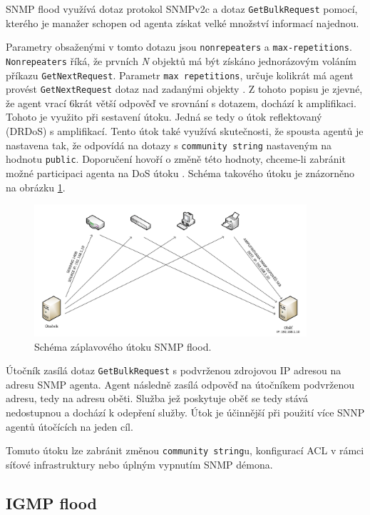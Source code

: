 SNMP flood využívá dotaz protokol SNMPv2c a dotaz \texttt{GetBulkRequest} pomocí, kterého je manažer schopen od agenta získat velké množství informací najednou.

Parametry obsaženými v tomto dotazu jsou \texttt{nonrepeaters} a \texttt{max-repetitions}. \texttt{Nonrepeaters} říká, že prvních \textit{N} objektů má být získáno jednorázovým voláním příkazu \texttt{GetNextRequest}. Parametr \texttt{max repetitions}, určuje kolikrát má agent provést \texttt{GetNextRequest} dotaz nad zadanými objekty \cite{Kukla2010}. Z tohoto popisu je zjevné, že agent vrací  6krát větší odpověď ve srovnání s dotazem, dochází k amplifikaci. Tohoto je využito při sestavení útoku. Jedná se tedy o útok reflektovaný (DRDoS) s amplifikací. Tento útok také využívá skutečnosti, že spousta agentů je nastavena tak, že odpovídá na dotazy s \texttt{community string} nastaveným na hodnotu \texttt{public}. Doporučení hovoří o změně této hodnoty, chceme-li zabránit možné participaci agenta na DoS útoku \cite{Stange-snmp-amplification}. Schéma takového útoku je znázorněno na obrázku \ref{fig:snmp-flood-schema}.


\begin{figure}[!h]
	\begin{center}
		\includegraphics[width=0.9\textwidth]{obrazky/snmp_flood_schema.png}
	\end{center}
	\caption{Schéma záplavového útoku SNMP flood.}
	\label{fig:snmp-flood-schema}
\end{figure}

Útočník zasílá dotaz \texttt{GetBulkRequest} s podvrženou zdrojovou IP adresou na adresu SNMP agenta. Agent následně zasílá odpověď na útočníkem podvrženou adresu, tedy na adresu oběti. Služba jež poskytuje oběť se tedy stává nedostupnou a dochází k odepření služby. 
Útok je účinnější při použití více SNNP agentů útočících na jeden cíl.

Tomuto útoku lze zabránit změnou \texttt{community string}u, konfigurací ACL v rámci síťové infrastruktury nebo úplným vypnutím SNMP démona.

\subsection{IGMP flood}
\label{subsec:igmp_flood}

 
